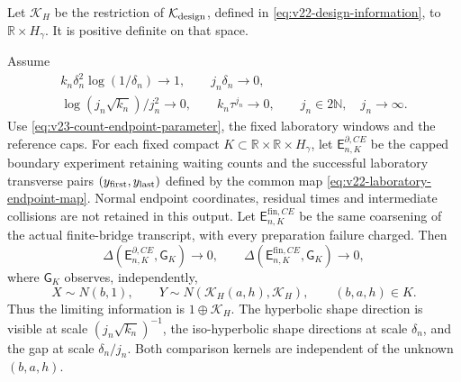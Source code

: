 Let \(\mathcal K_H\) be the restriction of
\(\mathcal K_{\rm design}\), defined in
\eqref{eq:v22-design-information}, to \(\mathbb R\times H_\gamma\).
It is positive definite on that space.

\begin{theorem}
\label{thm:v23-count-endpoint-joint}
Assume
\begin{equation}\label{eq:v23-count-endpoint-conditions}
 \begin{gathered}
 k_n\delta_n^2\log(1/\delta_n)\to1,\qquad j_n\delta_n\to0,\\
 \log(j_n\sqrt{k_n})/j_n^2\to0,\qquad
 k_n\tau^{j_n}\to0,\qquad j_n\in2\mathbb N,\quad j_n\to\infty.
 \end{gathered}
\end{equation}
Use \eqref{eq:v23-count-endpoint-parameter}, the fixed laboratory windows and
the reference caps.  For each fixed compact
\(K\subset\mathbb R\times\mathbb R\times H_\gamma\), let
\(\mathsf E^{\partial,CE}_{n,K}\) be the capped boundary experiment retaining
waiting counts and the successful laboratory transverse pairs
\((y_{\rm first},y_{\rm last})\) defined by the common map
\eqref{eq:v22-laboratory-endpoint-map}.  Normal endpoint coordinates,
residual times and intermediate collisions are not retained in this output.
Let \(\mathsf E^{\mathrm{fin},CE}_{n,K}\) be the same coarsening of the
actual finite-bridge transcript, with every preparation failure charged.
Then
\begin{equation}\label{eq:v23-count-endpoint-limit}
 \Delta(\mathsf E^{\partial,CE}_{n,K},\mathsf G_K)\to0,
 \qquad
 \Delta(\mathsf E^{\mathrm{fin},CE}_{n,K},\mathsf G_K)\to0,
\end{equation}
where \(\mathsf G_K\) observes, independently,
\[
 X\sim N(b,1),\qquad
 Y\sim N(\mathcal K_H(a,h),\mathcal K_H),
 \qquad (b,a,h)\in K.
\]
Thus the limiting information is \(1\oplus\mathcal K_H\).  The hyperbolic
shape direction is visible at scale \((j_n\sqrt{k_n})^{-1}\), the
iso-hyperbolic shape directions at scale \(\delta_n\), and the gap at
scale \(\delta_n/j_n\).  Both comparison kernels are independent of the
unknown \((b,a,h)\).
\end{theorem}

